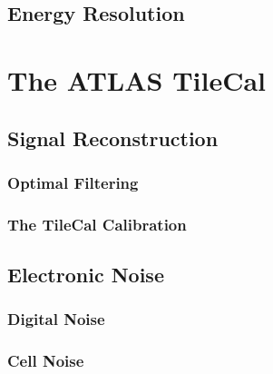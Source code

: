 \documentclass[10pt,twoside,cucitura,classica,english,openany]{toptesi}
\begin{document}


\subsection{Energy Resolution}
\label{sec:energy-resolution}



\section{The ATLAS TileCal}
\label{sec:atlas-tilecal}



\subsection{Signal Reconstruction}
\label{sec:sign-reconstr}



\subsubsection{Optimal Filtering}
\label{sec:optimal-filtering}



\subsubsection{The TileCal Calibration}
\label{sec:tilecal-calibration}



\subsection{Electronic Noise}
\label{sec:electronic-noise}



\subsubsection{Digital Noise}
\label{sec:digital-noise}



\subsubsection{Cell Noise}
\label{sec:cell-noise}
\end{document}
